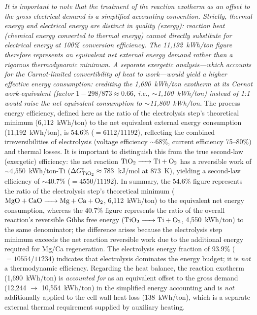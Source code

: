 \documentclass[sn-mathphys,Numbered]{sn-jnl}
\begin{document}
\emph{It is important to note that the treatment of the reaction exotherm as an offset to the gross electrical demand is a simplified accounting convention. Strictly, thermal energy and electrical energy are distinct in quality (exergy): reaction heat (chemical energy converted to thermal energy) cannot directly substitute for electrical energy at 100\% conversion efficiency. The 11{,}192~kWh/ton figure therefore represents an \emph{equivalent net external energy demand} rather than a rigorous thermodynamic minimum. A separate exergetic analysis---which accounts for the Carnot-limited convertibility of heat to work---would yield a higher effective energy consumption: crediting the 1{,}690~kWh/ton exotherm at its Carnot work-equivalent (factor $1 - 298/873 \approx 0.66$, i.e., $\sim$1{,}100~kWh/ton) instead of 1:1 would raise the net equivalent consumption to $\sim$11{,}800~kWh/ton.} The process energy efficiency, defined here as the ratio of the electrolysis step's theoretical minimum (6{,}112~kWh/ton) to the net equivalent external energy consumption (11{,}192~kWh/ton), is 54.6\% ($= 6112/11192$), reflecting the combined irreversibilities of electrolysis (voltage efficiency $\sim$68\%, current efficiency 75--80\%) and thermal losses. It is important to distinguish this from the true second-law (exergetic) efficiency: the net reaction $\ce{TiO2 -> Ti + O2}$ has a reversible work of $\sim$4{,}550~kWh/ton-Ti ($\Delta G^{\circ}_{\ce{TiO2}} \approx 783$~kJ/mol at 873~K), yielding a second-law efficiency of $\sim$40.7\% ($= 4550/11192$). In summary, the 54.6\% figure represents the ratio of the electrolysis step's theoretical minimum ($\ce{MgO + CaO -> Mg + Ca + O2}$, 6{,}112~kWh/ton) to the equivalent net energy consumption, whereas the 40.7\% figure represents the ratio of the overall reaction's reversible Gibbs free energy ($\ce{TiO2 -> Ti + O2}$, 4{,}550~kWh/ton) to the same denominator; the difference arises because the electrolysis step minimum exceeds the net reaction reversible work due to the additional energy required for Mg/Ca regeneration. The electrolysis energy fraction of 93.9\% ($= 10554/11234$) indicates that electrolysis dominates the energy budget; it is \emph{not} a thermodynamic efficiency. Regarding the heat balance, the reaction exotherm (1{,}690~kWh/ton) is \emph{accounted for} as an equivalent offset to the gross demand (12{,}244 $\to$ 10{,}554~kWh/ton) in the simplified energy accounting and is \emph{not} additionally applied to the cell wall heat loss (138~kWh/ton), which is a separate external thermal requirement supplied by auxiliary heating.
\end{document}
